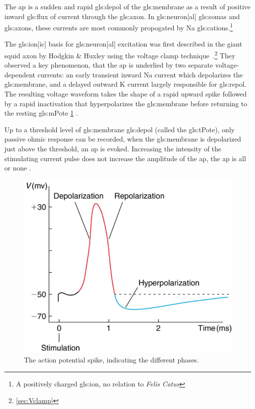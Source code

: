 \documentclass[class={myRUCProject}, crop=false]{standalone}
\begin{document}
The \gls{ap} is a sudden and rapid \gls{gls:depol} of the \gls{gls:membrane} as a result of positive inward \gls{gls:flux} of current through the \gls{gls:axon}. In \gls{gls:neuron}[al] \glspl{gls:soma} and \glspl{gls:axon}, these currents are most commonly propogated by \gls{Na} \glspl{gls:cation}.{}\footnote{A positively charged \gls{gls:ion}, no relation to \textit{Felis Catus}}

The \gls{gls:ion}[ic] basis for \gls{gls:neuron}[al] excitation was first described in the giant squid axon by Hodgkin \& Huxley  using the voltage clamp technique~\cite{HodHux1952}.\footnote{\cref{sec:Vclamp}}{} They observed a key phenomenon, that the \gls{ap} is underlied by two separate voltage-dependent currents: an early transient inward \gls{Na} current which depolarizes the \gls{gls:membrane}, and a delayed outward \gls{K} current largely responsible for \gls{gls:repol}. 
The resulting voltage waveform takes the shape of a rapid upward spike followed by a rapid inactivation that hyperpolarizes the \gls{gls:membrane} before returning to the resting \gls{gls:mPote} \cref{fig:AP} \cite{Hammond2015ch4}.

Up to a threshold level of \gls{gls:membrane} \gls{gls:depol} (called the \gls{gls:tPote}), only passive ohmic response can be recorded, when the \gls{gls:membrane} is depolarized just above the threshold, an \gls{ap} is evoked. 
Increasing the intensity of the stimulating current pulse does not increase the amplitude of the \gls{ap}, the \gls{ap} is all or none \cite{Hammond2015ch4}. 
\begin{figure}[H]
  \centering
  \includegraphics[width=0.5\linewidth]{Pictures//Anakin/AP.png}
  \caption{The action potential spike, indicating the different phases.}\label{fig:AP}
\end{figure}
\end{document}
